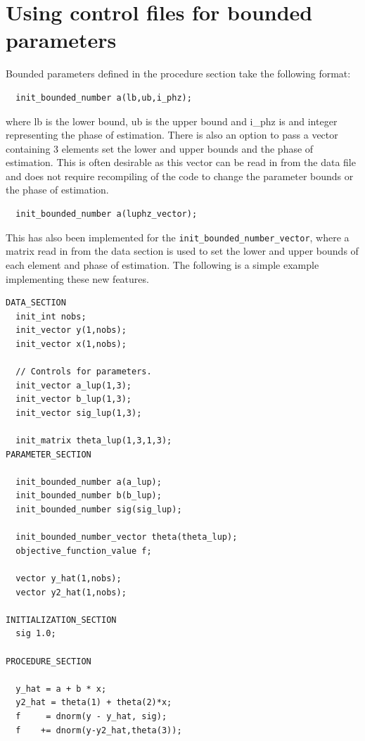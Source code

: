 \documentclass{admbmanual}
\begin{document}
\section{Using control files for bounded parameters}
%
{}
Bounded parameters defined in the procedure section take the following format:
\begin{lstlisting}
  init_bounded_number a(lb,ub,i_phz);
\end{lstlisting}
where lb is the lower bound, ub is the upper bound and i\_phz is and integer
representing the phase of estimation. There is also an option to pass a vector
containing 3 elements set the lower and upper bounds and the phase of
estimation. This is often desirable as this vector can be read in from the data
file and does not require recompiling of the code to change the parameter bounds
or the phase of estimation.

\begin{lstlisting}
  init_bounded_number a(luphz_vector);
\end{lstlisting}

This has also been implemented for the \texttt{init\_bounded\_number\_vector},
where a matrix read in from the data section is used to set the lower and upper
bounds of each element and phase of estimation. The following is a simple
example implementing these new features.

\begin{lstlisting}
DATA_SECTION
  init_int nobs;
  init_vector y(1,nobs);
  init_vector x(1,nobs);

  // Controls for parameters.
  init_vector a_lup(1,3);
  init_vector b_lup(1,3);
  init_vector sig_lup(1,3);

  init_matrix theta_lup(1,3,1,3);
PARAMETER_SECTION

  init_bounded_number a(a_lup);
  init_bounded_number b(b_lup);
  init_bounded_number sig(sig_lup);

  init_bounded_number_vector theta(theta_lup);
  objective_function_value f;

  vector y_hat(1,nobs);
  vector y2_hat(1,nobs);

INITIALIZATION_SECTION
  sig 1.0;

PROCEDURE_SECTION

  y_hat = a + b * x;
  y2_hat = theta(1) + theta(2)*x;
  f     = dnorm(y - y_hat, sig);
  f    += dnorm(y-y2_hat,theta(3));
\end{lstlisting}
\end{document}
